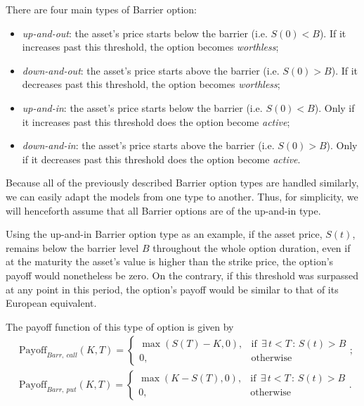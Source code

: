 There are four main types of Barrier option:
\begin{itemize}
\item \emph{up-and-out}: the asset's price starts below the barrier (i.e. $S(0)<B$). If it increases past this threshold, the option becomes \emph{worthless};
\item \emph{down-and-out}: the asset's price starts above the barrier (i.e. $S(0)>B$). If it decreases past this threshold, the option becomes \emph{worthless};
\item \emph{up-and-in}: the asset's price starts below the barrier (i.e. $S(0)<B$). Only if it increases past this threshold does the option become \emph{active};
\item \emph{down-and-in}: the asset's price starts above the barrier (i.e. $S(0)>B$). Only if it decreases past this threshold does the option become \emph{active}.
\end{itemize}

Because all of the previously described Barrier option types are handled similarly, we can easily adapt the models from one type to another. Thus, for simplicity, we will henceforth assume that all Barrier options are of the up-and-in type.

Using the up-and-in Barrier option type as an example, if the asset price, $S(t)$, remains below the barrier level $B$ throughout the whole option duration, even if at the maturity the asset's value is higher than the strike price, the option's payoff would nonetheless be zero. On the contrary, if this threshold was surpassed at any point in this period, the option's payoff would be similar to that of its European equivalent.


The payoff function of this type of option is given by
\begin{equation}
\begin{split}
&\text{Payoff}_{Barr,\ call}(K,T)=\begin{cases} 
      \max\left(S(T)-K,0\right), & \mathrm{if}\ \ \exists\,t<T\,:\,S(t)>B\\
      0, & \mathrm{otherwise}
   \end{cases};\\
&\text{Payoff}_{Barr,\ put}(K,T)=\begin{cases} 
      \max\left(K-S(T),0\right), & \mathrm{if}\ \ \exists\,t<T\,:\,S(t)>B\\
      0, & \mathrm{otherwise}
   \end{cases}.
\end{split}
\end{equation}



